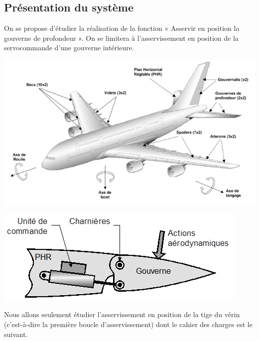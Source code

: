 \documentclass[10pt,fleqn]{article} %
\begin{document}
\begin{multicols}{2}
\fi


\subsection*{Présentation du système}
\setcounter{subparagraph}{0}

On se propose d’étudier la réalisation de la fonction « Asservir en position la gouverne de profondeur ». On se limitera à l’asservissement en position de la servocommande d’une gouverne intérieure. 

\begin{center}
\includegraphics[width=\linewidth]{images/fig_01}

\includegraphics[width=\linewidth]{images/fig_02}
\end{center}

Nous allons seulement étudier l’asservissement en position de la tige du vérin (c’est-à-dire la première boucle d’asservissement) dont le cahier des charges est le suivant.


\end{multicols}
\end{document}
